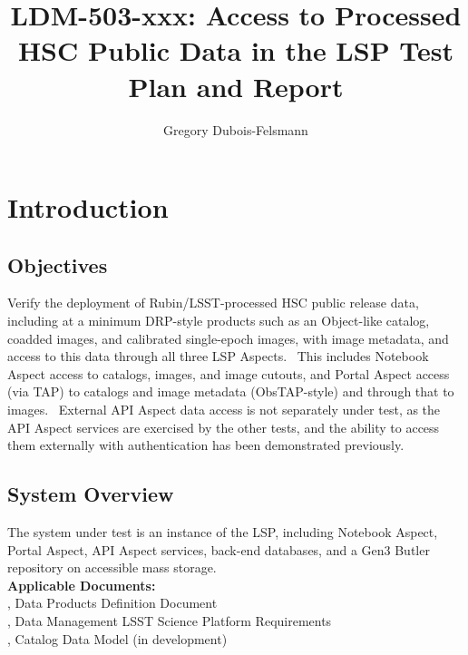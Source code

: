 \documentclass[DM,lsstdraft,STR,toc]{lsstdoc}
\begin{document}
\def\milestoneName{Access to Processed HSC Public Data in the LSP}
\def\milestoneId{LDM-503-xxx}
\def\product{LSP Services}


\title{LDM-503-xxx: Access to Processed HSC Public Data in the LSP Test Plan and Report}
\setDocRef{\lsstDocType-\lsstDocNum}
\date{\vcsdate}
\author{ Gregory Dubois-Felsmann }






\maketitle

\section{Introduction}
\label{sect:intro}


\subsection{Objectives}
\label{sect:objectives}

 Verify the deployment of Rubin/LSST-processed HSC public release data,
including at a minimum DRP-style products such as an Object-like
catalog, coadded images, and calibrated single-epoch images, with image
metadata, and access to this data through all three LSP Aspects. ~This
includes Notebook Aspect access to catalogs, images, and image cutouts,
and Portal Aspect access (via TAP) to catalogs and image metadata
(ObsTAP-style) and through that to images. ~External API Aspect data
access is not separately under test, as the API Aspect services are
exercised by the other tests, and the ability to access them externally
with authentication has been demonstrated previously.



\subsection{System Overview}
\label{sect:systemoverview}

 The system under test is an instance of the LSP, including Notebook
Aspect, Portal Aspect, API Aspect services, back-end databases, and a
Gen3 Butler repository on accessible mass
storage.\\[2\baselineskip]\textbf{Applicable
Documents:}\\[2\baselineskip], Data Products Definition
Document\\
, Data Management LSST Science Platform Requirements\\
, Catalog Data Model (in development)
\end{document}
